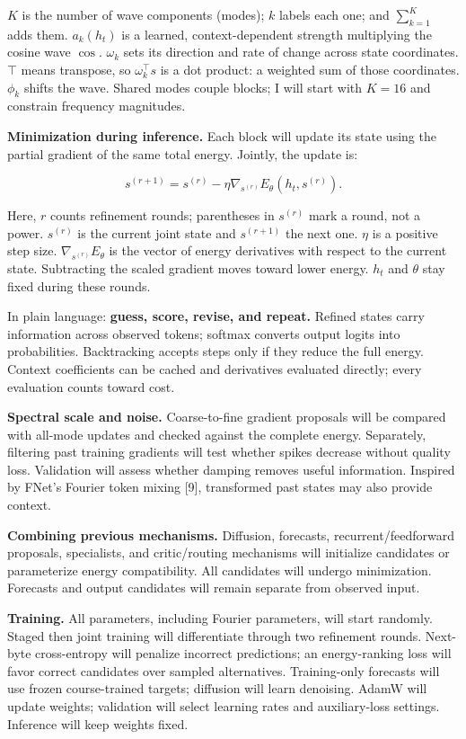 \documentclass[11pt,letterpaper]{article}
\begin{document}
\(K\) is the number of wave components (modes); \(k\) labels each one; and \(\sum_{k=1}^{K}\) adds them. \(a_k(h_t)\) is a learned, context-dependent strength multiplying the cosine wave \(\cos\). \(\omega_k\) sets its direction and rate of change across state coordinates. \(\top\) means transpose, so \(\omega_k^\top s\) is a dot product: a weighted sum of those coordinates. \(\phi_k\) shifts the wave. Shared modes couple blocks; I will start with \(K=16\) and constrain frequency magnitudes.

\textbf{Minimization during inference.} Each block will update its state using the partial gradient of the same total energy. Jointly, the update is:

\[
s^{(r+1)}=s^{(r)}-\eta\nabla_{s^{(r)}}E_\theta(h_t,s^{(r)}).
\]

Here, \(r\) counts refinement rounds; parentheses in \(s^{(r)}\) mark a round, not a power. \(s^{(r)}\) is the current joint state and \(s^{(r+1)}\) the next one. \(\eta\) is a positive step size. \(\nabla_{s^{(r)}}E_\theta\) is the vector of energy derivatives with respect to the current state. Subtracting the scaled gradient moves toward lower energy. \(h_t\) and \(\theta\) stay fixed during these rounds.

In plain language: \textbf{guess, score, revise, and repeat.} Refined states carry information across observed tokens; softmax converts output logits into probabilities. Backtracking accepts steps only if they reduce the full energy. Context coefficients can be cached and derivatives evaluated directly; every evaluation counts toward cost.

\textbf{Spectral scale and noise.} Coarse-to-fine gradient proposals will be compared with all-mode updates and checked against the complete energy. Separately, filtering past training gradients will test whether spikes decrease without quality loss. Validation will assess whether damping removes useful information. Inspired by FNet's Fourier token mixing [9], transformed past states may also provide context.

\textbf{Combining previous mechanisms.} Diffusion, forecasts, recurrent/feedforward proposals, specialists, and critic/routing mechanisms will initialize candidates or parameterize energy compatibility. All candidates will undergo minimization. Forecasts and output candidates will remain separate from observed input.

\textbf{Training.} All parameters, including Fourier parameters, will start randomly. Staged then joint training will differentiate through two refinement rounds. Next-byte cross-entropy will penalize incorrect predictions; an energy-ranking loss will favor correct candidates over sampled alternatives. Training-only forecasts will use frozen course-trained targets; diffusion will learn denoising. AdamW will update weights; validation will select learning rates and auxiliary-loss settings. Inference will keep weights fixed.
\end{document}
